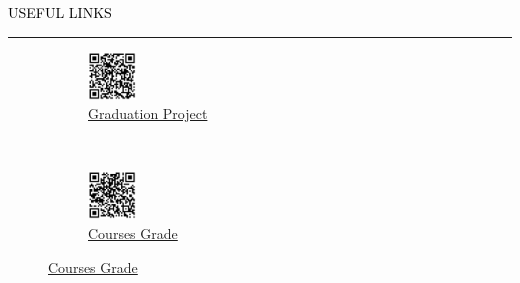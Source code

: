 \documentclass{resume} %
\renewenvironment{rSection}[1]{
\sectionskip
\textcolor{black}{\MakeUppercase{#1}}
\sectionlineskip
\hrule
\begin{list}{}{
\setlength{\leftmargin}{1.5em}
}
\item[]
}{
\end{list}
}
\begin{document}
\begin{rSection}{Useful Links}  
\begin{figure}[H]
    \centering
    \begin{subfigure}[t]{0.5\textwidth}
        \centering
        \includegraphics[height=0.5in]{GraduationProject.jpg}
        \caption{\href{https://drive.google.com/file/d/1vL6V7qEHOOi3-hYtSzS2O25Ldthgse1i/view?usp=sharing}{\color{blue}Graduation Project}}
    \end{subfigure}%
    ~ 
    \begin{subfigure}[t]{0.5\textwidth}
        \centering
        \includegraphics[height=0.5in]{CoursesDegree.jpg}
        \caption{\href{https://drive.google.com/file/d/1F50DDXvgqMtAoCs6Qjr5yMD2jWmPWW3m/view?usp=drive_link}{\color{blue}Courses Grade}}
    \end{subfigure}
\end{figure}
\end{rSection}
\end{document}
